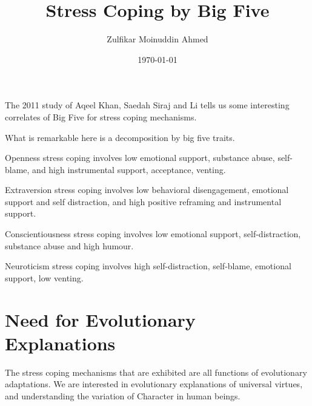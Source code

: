 \documentclass{amsart}
\title{Stress Coping by Big Five}
\author{Zulfikar Moinuddin Ahmed}
\date{\today}
\begin{document}
\maketitle
The 2011 study of Aqeel Khan, Saedah Siraj and Li tells us some interesting correlates of Big Five for stress coping mechanisms.

What is remarkable here is a decomposition by big five traits.

Openness stress coping involves low emotional support, substance abuse, self-blame, and high instrumental support, acceptance, venting.

Extraversion stress coping involves low behavioral disengagement, emotional support and self distraction, and high positive reframing and instrumental support.

Conscientiousness stress coping involves low emotional support, self-distraction, substance abuse and high humour.

Neuroticism stress coping involves high self-distraction, self-blame, emotional support, low venting.

\section{Need for Evolutionary Explanations}

The stress coping mechanisms that are exhibited are all functions of evolutionary adaptations.  We are interested in evolutionary explanations of universal virtues, and understanding the variation of Character in human beings.
\end{document}
